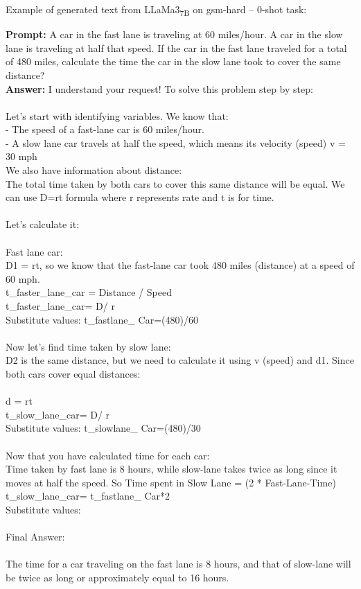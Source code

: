 \noindent Example of generated text from LLaMa3\textsubscript{7B} on gsm-hard -- 0-shot task:
\begin{displayquote}
	\textbf{Prompt:} A car in the fast lane is traveling at 60 miles/hour. A car in the slow lane is traveling at half that speed. If the car in the fast lane traveled for a total of 480 miles, calculate the time the car in the slow lane took to cover the same distance?\\
	\textbf{Answer:} I understand your request! To solve this problem step by step:\\
	\\
	Let's start with identifying variables. We know that:\\
	- The speed of a fast-lane car is 60 miles/hour.\\
	- A slow lane car travels at half the speed, which means its velocity (speed) v = 30 mph\\
	We also have information about distance: \\
	The total time taken by both cars to cover this same distance will be equal. We can use D=rt formula where r represents rate and t is for time.\\
	\\
	Let's calculate it:\\
	\\
	Fast lane car:\\
	D1 = rt, so we know that the fast-lane car took 480 miles (distance) at a speed of 60 mph.\\
	t\_faster\_lane\_car = Distance / Speed\\
	t\_faster\_lane\_car= D/ r \\
	Substitute values: t\_fastlane\_ Car=(480)/60\\
	\\
	Now let's find time taken by slow lane:\\
	D2 is the same distance, but we need to calculate it using v (speed) and d1. Since both cars cover equal distances:\\
	\\
	d = rt\\
	t\_slow\_lane\_car= D/ r \\
	Substitute values: t\_slowlane\_ Car=(480)/30\\
	\\
	Now that you have calculated time for each car:\\
	Time taken by fast lane is 8 hours, while slow-lane takes twice as long since it moves at half the speed. So Time spent in Slow Lane = (2 * Fast-Lane-Time) \\
	t\_slow\_lane\_car= t\_fastlane\_ Car*2\\
	Substitute values: \\
	\\
	Final Answer:\\
	\\
	The time for a car traveling on the fast lane is 8 hours, and that of slow-lane will be twice as long or approximately equal to 16 hours.
\end{displayquote}
